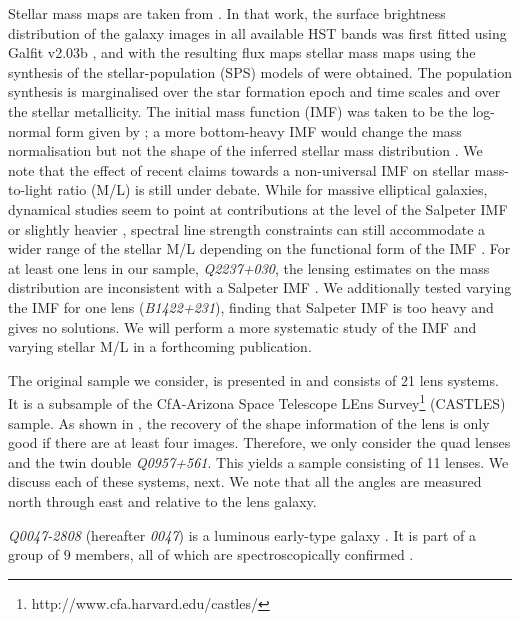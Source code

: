 \documentclass[useAMS,usenatbib]{mn2e}
\begin{document}
Stellar mass maps are taken from \citet{2011ApJ...740...97L}. In that work, the surface brightness distribution of the galaxy images in all available HST bands was first fitted using {\sc Galfit v2.03b} \citep{2002AJ....124..266P}, and with the resulting flux maps stellar mass maps using the synthesis of the stellar-population (SPS) models of \citet{2003MNRAS.344.1000B} were obtained. The population synthesis is marginalised over the star formation epoch and time scales and over the stellar metallicity. The initial mass function (IMF) was taken to be the log-normal form given by \citet{2003PASP..115..763C}; a more bottom-heavy IMF would change the mass normalisation \citep[cf.][]{2014ApJ...793...96S} but not the shape of the inferred stellar mass distribution \citep[unless the IMF presents significant intrinsic deviations locally, see e.g.][]{2015MNRAS.447.1033M}. We note that the effect of recent claims towards a non-universal IMF on stellar mass-to-light ratio (M/L) is still under debate. While for massive elliptical galaxies, dynamical studies seem to point at contributions at the level of the Salpeter IMF or slightly heavier \citep{2013MNRAS.432.1862C}, spectral line strength constraints can still accommodate a wider range of the stellar M/L depending on the functional form of the IMF \citep{2013MNRAS.429L..15F}. For at least one lens in our sample, \textit{Q2237+030}, the lensing estimates on the mass distribution are inconsistent with a Salpeter IMF \citep{2010MNRAS.409L..30F}. We additionally tested varying the IMF for one lens ({\it B1422+231}), finding that Salpeter IMF is too heavy and gives no solutions. We will perform a more systematic study of the IMF and varying stellar M/L in a forthcoming publication.

The original sample we consider, is presented in \citet{2011ApJ...740...97L} and consists of 21 lens systems. It is a subsample of the CfA-Arizona Space Telescope LEns Survey\footnote{http://www.cfa.harvard.edu/castles/} (CASTLES) sample. As shown in \citet{2014MNRAS.445.2181C}, the recovery of the shape information of the lens is only good if there are at least four images. Therefore, we only consider the quad lenses and the twin double \textit{Q0957+561}. This yields a sample consisting of 11 lenses. We discuss each of these systems, next. We note that all the angles are measured north through east and relative to the lens galaxy.

\textit{Q0047-2808} (hereafter \textit{0047}) is a luminous early-type galaxy \citep{1996MNRAS.278..139W}. It is part of a group of 9 members, all of which are spectroscopically confirmed \citep{2011ApJ...726...84W}.
\end{document}
